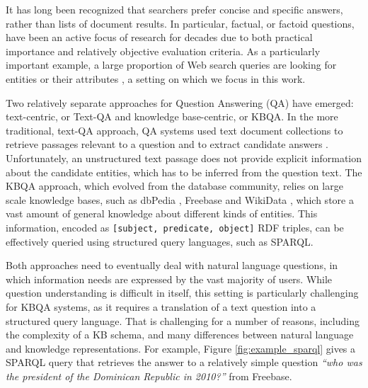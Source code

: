 It has long been recognized that searchers prefer concise and specific answers, rather than lists of document results. In particular, factual, or factoid questions, have been an active focus of research for decades due to both practical importance and relatively objective evaluation criteria. As a particularly important example, a large proportion of Web search queries are looking for entities or their attributes \cite{Pound:2010:AOR:1772690.1772769}, a setting on which we focus in this work. 

Two relatively separate approaches for Question Answering (QA) have emerged: text-centric, or Text-QA and knowledge base-centric, or KBQA.
In the more traditional, text-QA approach, QA systems used text document collections to retrieve passages relevant to a question and to extract candidate answers \cite{dang2007overview}.
Unfortunately, an unstructured text passage does not provide explicit information about the candidate entities, which has to be inferred from the question text.
The KBQA approach, which evolved from the database community, relies on large scale knowledge bases, such as dbPedia \cite{auer2007dbpedia}, Freebase \cite{Bollacker:2008:FCC:1376616.1376746} and WikiData \cite{Vrandecic:2014:WFC:2661061.2629489}, which store a vast amount of general knowledge about different kinds of entities.
This information, encoded as \texttt{[subject, predicate, object]} RDF triples, can be effectively queried using structured query languages, such as SPARQL.

Both approaches need to eventually deal with natural language questions, in which information needs are expressed by the vast majority of users. While question understanding is difficult in itself, this setting is particularly challenging for KBQA systems, as it requires a translation of a text question into a structured query language. That is challenging for a number of reasons, including the complexity of a KB schema, and many differences between natural language and knowledge representations.  For example, Figure \ref{fig:example_sparql} gives a SPARQL query that retrieves the answer to a relatively simple question \textit{``who was the president of the Dominican Republic in 2010?''} from Freebase.


